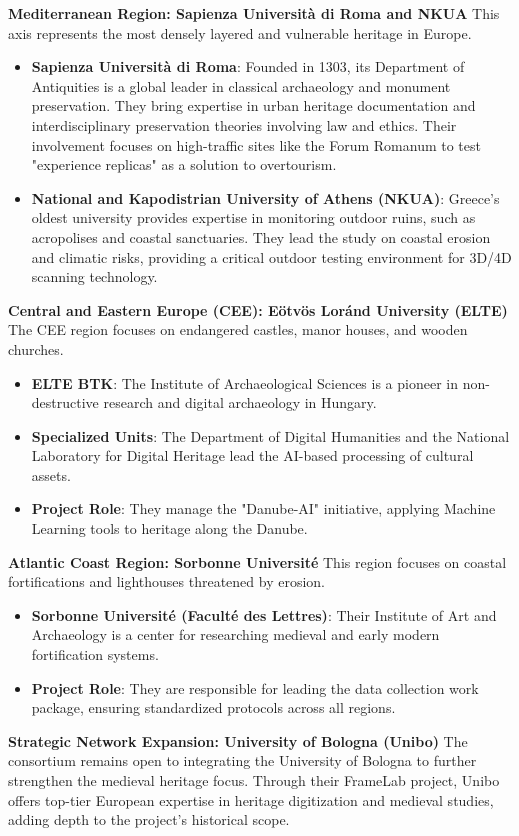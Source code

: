 \textbf{Mediterranean Region: Sapienza Università di Roma and NKUA}
This axis represents the most densely layered and vulnerable heritage in Europe.
\begin{itemize}
    \item \textbf{Sapienza Università di Roma}: Founded in 1303, its Department of Antiquities is a global leader in classical archaeology and monument preservation. They bring expertise in urban heritage documentation and interdisciplinary preservation theories involving law and ethics. Their involvement focuses on high-traffic sites like the Forum Romanum to test "experience replicas" as a solution to overtourism.
    \item \textbf{National and Kapodistrian University of Athens (NKUA)}: Greece's oldest university provides expertise in monitoring outdoor ruins, such as acropolises and coastal sanctuaries. They lead the study on coastal erosion and climatic risks, providing a critical outdoor testing environment for 3D/4D scanning technology.
\end{itemize}

\textbf{Central and Eastern Europe (CEE): Eötvös Loránd University (ELTE)}
The CEE region focuses on endangered castles, manor houses, and wooden churches.
\begin{itemize}
    \item \textbf{ELTE BTK}: The Institute of Archaeological Sciences is a pioneer in non-destructive research and digital archaeology in Hungary.
    \item \textbf{Specialized Units}: The Department of Digital Humanities and the National Laboratory for Digital Heritage lead the AI-based processing of cultural assets.
    \item \textbf{Project Role}: They manage the "Danube-AI" initiative, applying Machine Learning tools to heritage along the Danube.
\end{itemize}

\textbf{Atlantic Coast Region: Sorbonne Université}
This region focuses on coastal fortifications and lighthouses threatened by erosion.
\begin{itemize}
    \item \textbf{Sorbonne Université (Faculté des Lettres)}: Their Institute of Art and Archaeology is a center for researching medieval and early modern fortification systems.
    \item \textbf{Project Role}: They are responsible for leading the data collection work package, ensuring standardized protocols across all regions.
\end{itemize}

\textbf{Strategic Network Expansion: University of Bologna (Unibo)}
The consortium remains open to integrating the University of Bologna to further strengthen the medieval heritage focus. Through their FrameLab project, Unibo offers top-tier European expertise in heritage digitization and medieval studies, adding depth to the project's historical scope.